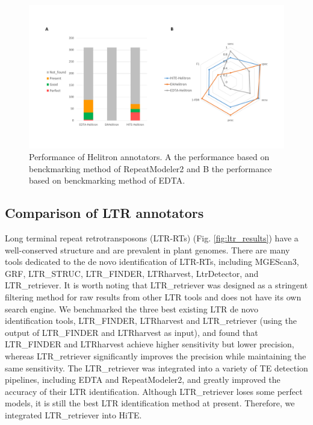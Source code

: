 \documentclass{bmcart}
\begin{document}
\begin{figure}[h!]
	\centerline{\includegraphics[width=1.0\textwidth]{figures/HelitronResults.pdf}}
	\caption{Performance of Helitron annotators. A the performance based on benckmarking method of RepeatModeler2 and B the performance based on benckmarking method of EDTA.}
	\label{fig:helitron_results}
\end{figure}


\subsection*{Comparison of LTR annotators}
Long terminal repeat retrotransposons (LTR-RTs) (Fig. \ref{fig:ltr_results}) have a well-conserved structure and are prevalent in plant genomes. There are many tools dedicated to the de novo identification of LTR-RTs, including MGEScan3\cite{lee2016mgescan}, GRF, LTR\_STRUC\cite{mccarthy2003ltr_struc}, LTR\_FINDER\cite{xu2007ltr_finder}, LTRharvest\cite{ellinghaus2008ltrharvest}, LtrDetector\cite{valencia2019ltrdetector}, and LTR\_retriever\cite{ou2018ltr_retriever}. It is worth noting that LTR\_retriever was designed as a stringent filtering method for raw results from other LTR tools and does not have its own search engine. We benchmarked the three best existing LTR de novo identification tools, LTR\_FINDER, LTRharvest and LTR\_retriever (using the output of LTR\_FINDER and LTRharvest as input), and found that LTR\_FINDER and LTRharvest achieve higher sensitivity but lower precision, whereas LTR\_retriever significantly improves the precision while maintaining the same sensitivity. The LTR\_retriever was integrated into a variety of TE detection pipelines, including EDTA and RepeatModeler2, and greatly improved the accuracy of their LTR identification. Although LTR\_retriever loses some perfect models, it is still the best LTR identification method at present. Therefore, we integrated LTR\_retriever into HiTE.
\end{document}
